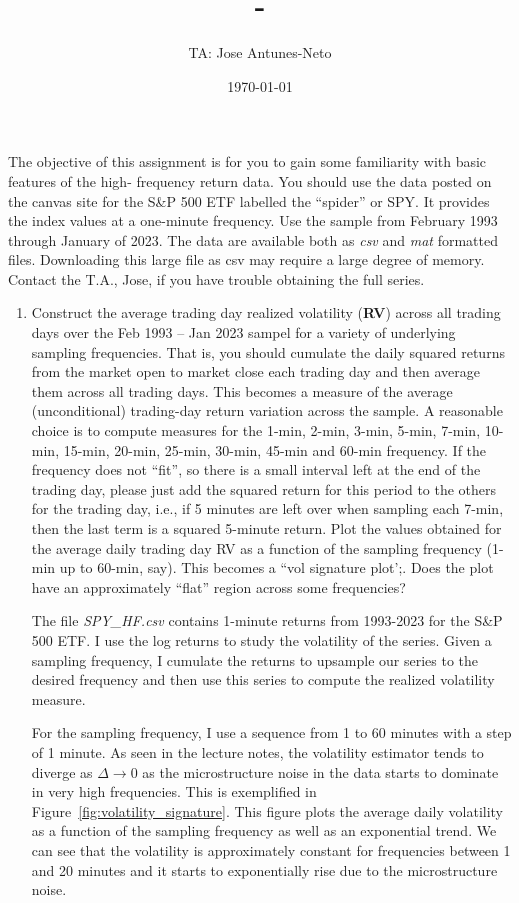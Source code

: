 \documentclass[12pt,twoside]{article}
\title{\course-\assignment}
\author{TA: Jose Antunes-Neto}
\date{\today}
\begin{document}
\maketitle

The objective of this assignment is for you to gain some familiarity with basic features of the high- frequency return data. You should use the data posted on the canvas site for the S\&P 500 ETF labelled the “spider” or SPY. It provides the index values at a one-minute frequency. Use the sample from February 1993 through January of 2023. The data are available both as \textit{csv} and \textit{mat} formatted files. Downloading this large file as csv may require a large degree of memory. Contact the T.A., Jose, if you have trouble obtaining the full series.

\begin{enumerate}[label = \arabic*)]
    \item Construct the average trading day realized volatility (\textbf{RV}) across all trading days over the Feb 1993 -- Jan 2023 sampel for a variety of underlying sampling frequencies. That is, you should cumulate the daily squared returns from the market open to market close each trading day and then average them across all trading days. This becomes a measure of the average (unconditional) trading-day return variation across the sample. A reasonable choice is to compute measures for the 1-min, 2-min, 3-min, 5-min, 7-min, 10-min, 15-min, 20-min, 25-min, 30-min, 45-min and 60-min frequency. If the frequency does not ``fit'', so there is a small interval left at the end of the trading day, please just add the squared return for this period to the others for the trading day, i.e., if 5 minutes are left over when sampling each 7-min, then the last term is a squared 5-minute return. Plot the values obtained for the average daily trading day RV as a function of the sampling frequency (1-min up to 60-min, say). This becomes a ``vol signature plot';. Does the plot have an approximately ``flat'' region across some frequencies?
    \begin{solution}
        The file \textit{SPY\_HF.csv} contains 1-minute returns from 1993-2023 for the S\&P 500 ETF. I use the log returns to study the volatility of the series. Given a sampling frequency, I cumulate the returns to upsample our series to the desired frequency and then use this series to compute the realized volatility measure. 

        For the sampling frequency, I use a sequence from 1 to 60 minutes with a step of 1 minute. As seen in the lecture notes, the volatility estimator tends to diverge as \(\Delta \to 0\) as the microstructure noise in the data starts to dominate in very high frequencies. This is exemplified in Figure~\ref{fig:volatility_signature}. This figure plots the average daily volatility as a function of the sampling frequency as well as an exponential trend. We can see that the volatility is approximately constant for frequencies between 1 and 20 minutes and it starts to exponentially rise due to the microstructure noise.


\end{solution}
\end{enumerate}
\end{document}
